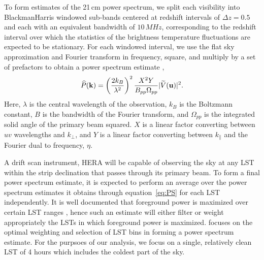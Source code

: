 \documentclass[twocolumn]{emulateapj}
\begin{document}
To form estimates of the 21\,cm power spectrum, we split each visibility into BlackmanHarris windowed sub-bands centered at redshift intervals of $\Delta z = 0.5$ and each with an equivalent bandwidth of $10\,MHz$, corresponding to the redshift interval over which the statistics of the brightness temperature fluctuations are expected to be stationary. For each windowed interval, we use the flat sky approximation and  Fourier transform in frequency, square, and multiply by a set of prefactors to obtain a power spectrum estimate \citep{Parsons:2014},
\begin{equation}\label{eq:PS}
\widehat{P}({\bf k}) = \left( \frac{2 k_B}{\lambda^2} \right)^2 \frac{X^2 Y}{B_{pp} \Omega_{pp}} | \widetilde{V}({\bf u}) |^2.
\end{equation}
Here, $\lambda$ is the central wavelength of the observation, $k_B$ is the Boltzmann constant, $B$ is the bandwidth of the Fourier transform, and $\Omega_{pp}$ is the integrated solid angle of the primary beam squared. $X$ is a linear factor converting between $uv$ wavelengths and $k_\perp$, and $Y$ is a linear factor converting between $k_\parallel$ and the Fourier dual to frequency, $\eta$. 

A drift scan instrument, HERA will be capable of observing the sky at any LST within the strip declination that passes through its primary beam. To form a final power spectrum estimate, it is expected to perform an average over the power spectrum estimates it obtains through equation~\ref{eq:PS} for each LST independently. It is well documented that foreground power is maximized over certain LST ranges \citep{Thyagarajan:2015a}, hence such an estimate will either filter or weight appropriately the LSTs in which foreground power is maximized. \citet{Thyagarajan:2015c} focuses on the optimal weighting and selection of LST bins in forming a power spectrum estimate. For the purpsoes of our analysis, we focus on a single, relatively clean LST of 4 hours which includes the coldest part of the sky. 
\end{document}
